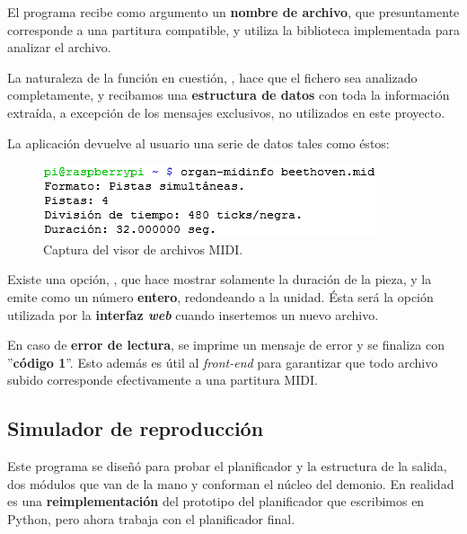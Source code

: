 El programa recibe como argumento un \textbf{nombre de archivo}, que presuntamente corresponde a una partitura compatible, y utiliza la biblioteca implementada para analizar el archivo.

La naturaleza de la función en cuestión, , hace que el fichero sea analizado completamente, y recibamos una \textbf{estructura de datos} con toda la información extraída, a excepción de los mensajes exclusivos, no utilizados en este proyecto.

La aplicación devuelve al usuario una serie de datos tales como éstos:

\smallskip

\begin{figure}[H]
	\noindent \begin{centering}
		\includegraphics[width=\linewidth/2]{capitulo5/cap_midinfo}
		\par\end{centering}
	\smallskip
	\caption{\label{fig:cap_midinfo} Captura del visor de archivos MIDI.}
\end{figure} 

\smallskip

Existe una opción, , que hace mostrar solamente la duración de la pieza, y la emite como un número \textbf{entero}, redondeando a la unidad. Ésta será la opción utilizada por la \textbf{interfaz \textit{web}} cuando insertemos un nuevo archivo.

En caso de \textbf{error de lectura}, se imprime un mensaje de error y se finaliza con ''\textbf{código 1}''. Esto además es útil al \textit{front-end} para garantizar que todo archivo subido corresponde efectivamente a una partitura \acrshort{MIDI}.

\subsection{Simulador de reproducción}
\label{subsec:simulador_reproduccion}

Este programa se diseñó para probar el planificador y la estructura de la salida, dos módulos que van de la mano y conforman el núcleo del demonio. En realidad es una \textbf{reimplementación} del prototipo del planificador que escribimos en Python, pero ahora trabaja con el planificador final.

